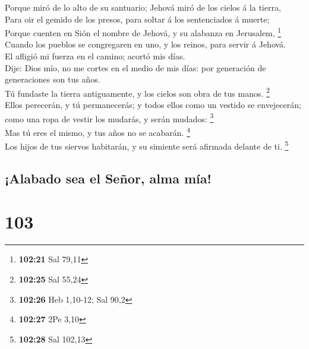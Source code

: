  Porque miró de lo alto de su santuario; Jehová miró de
los cielos á la tierra,\\
 Para oir el gemido de los presos, para soltar á los
sentenciados á muerte;\\
 Porque cuenten en Sión el nombre de Jehová, y su
alabanza en Jerusalem, \footnote{\textbf{102:21} Sal 79,11}\\
 Cuando los pueblos se congregaren en uno, y los reinos,
para servir á Jehová.\\
 El afligió mi fuerza en el camino; acortó mis días.\\
 Dije: Dios mío, no me cortes en el medio de mis días:
por generación de generaciones son tus años.\\
 Tú fundaste la tierra antiguamente, y los cielos son
obra de tus manos. \footnote{\textbf{102:25} Sal 55,24}\\
 Ellos perecerán, y tú permanecerás; y todos ellos como
un vestido se envejecerán; como una ropa de vestir los mudarás, y serán
mudados: \footnote{\textbf{102:26} Heb 1,10-12; Sal 90,2}\\
 Mas tú eres el mismo, y tus años no se acabarán.
\footnote{\textbf{102:27} 2Pe 3,10}\\
 Los hijos de tus siervos habitarán, y su simiente será
afirmada delante de ti. \footnote{\textbf{102:28} Sal 102,13}

\hypertarget{alabado-sea-el-seuxf1or-alma-muxeda}{%
\subsection{¡Alabado sea el Señor, alma
mía!}\label{alabado-sea-el-seuxf1or-alma-muxeda}}

\hypertarget{section-102}{%
\section{103}\label{section-102}}

